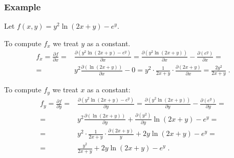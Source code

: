 \begin{frame}
  \frametitle{Example}
  Let $f(x,y) = y^2\ln{(2x+y)}- e^y$.

To compute $f_x$ \pause we treat $y$ as a constant.\pause
%
\begin{align*}
  f_x = \frac{\partial f}{\partial x} = & \frac{\partial(y^2\ln{(2x+y)}- e^y)}{\partial x} = \frac{\partial(y^2\ln{(2x+y)})}{\partial x} - \frac{\partial(e^y)}{\partial x} = \\
  = & y^2 \frac{\partial(\ln{(2x+y)})}{\partial x} - 0 = y^2 \cdot \frac{1}{2x+y} \cdot \frac{\partial(2x+y)}{\partial x}= \frac{2y^2}{2x+y}\; .
\end{align*}

\pause To compute $f_y$ we treat $x$ as a constant:\pause
%
\begin{align*}
  f_y = \frac{\partial f}{\partial y} = & \frac{\partial(y^2\ln{(2x+y)}- e^y)}{\partial y} = \frac{\partial(y^2\ln{(2x+y)})}{\partial y} - \frac{\partial(e^y)}{\partial y} = \\
  = & y^2 \frac{\partial(\ln{(2x+y)})}{\partial y} +\frac{\partial(y^2)}{\partial y} \ln{(2x+y)}
   - e^y = \\
   = & y^2 \cdot \frac{1}{2x+y} \cdot \frac{\partial(2x+y)}{y} +2y\ln{(2x+y)} - e^y = \\
   = & \frac{y^2}{2x+y} +2y\ln{(2x+y)} - e^y \; .
\end{align*}
\end{frame}